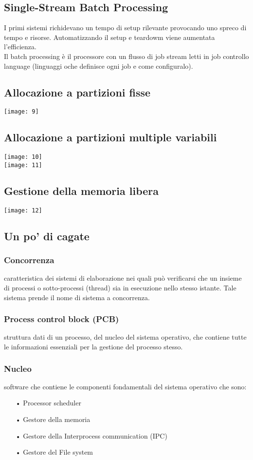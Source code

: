\documentclass{article}
\begin{document}
\subsection{Single-Stream Batch Processing}
I primi sistemi richidevano un tempo di setup rilevante provocando uno spreco di tempo e risorse. Automatizzando il setup e teardowm viene aumentata l’efficienza.
\\Il batch processing è il processore con un flusso di job stream letti in job controllo language (linguaggi oche definisce ogni job e come configuralo).

\subsection{Allocazione a partizioni fisse}
\texttt{[image: 9]}

\subsection{Allocazione a partizioni multiple variabili}
\texttt{[image: 10]}\\
\texttt{[image: 11]}

\subsection{Gestione della memoria libera}
\texttt{[image: 12]}

\subsection{Un po' di cagate}
\subsubsection{Concorrenza}
caratteristica dei sistemi di elaborazione nei quali può
verificarsi che un insieme di processi o sotto-processi (thread) sia in esecuzione nello stesso istante. Tale sistema prende il nome di sistema a
concorrenza.

\subsubsection{Process control block (PCB)}
struttura dati di un processo, del nucleo
del sistema operativo, che contiene tutte le informazioni essenziali per la
gestione del processo stesso.

\subsubsection{Nucleo}
software che contiene le componenti fondamentali del
sistema operativo che sono:
\begin{enumerate}
   \item[•] Processor scheduler
   \item[•] Gestore della memoria
   \item[•] Gestore della Interprocess communication (IPC)
   \item[•] Gestore del File system
\end{enumerate}
\end{document}
